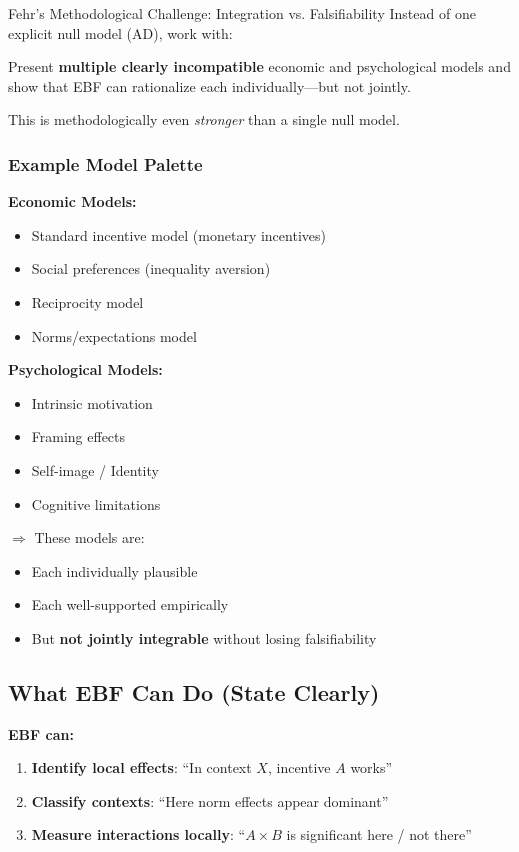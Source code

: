 \begin{chapter}{Fehr's Methodological Challenge: Integration vs. Falsifiability}
Instead of one explicit null model (AD), work with:

\begin{tcolorbox}[colback=green!5!white,colframe=green!75!black,title=\textbf{The Multiple Models Strategy}]
Present \textbf{multiple clearly incompatible} economic and psychological models
and show that EBF can rationalize each individually---but not jointly.

This is methodologically even \textit{stronger} than a single null model.
\end{tcolorbox}

\subsubsection{Example Model Palette}

\textbf{Economic Models:}
\begin{itemize}[noitemsep]
    \item Standard incentive model (monetary incentives)
    \item Social preferences (inequality aversion)
    \item Reciprocity model
    \item Norms/expectations model
\end{itemize}

\textbf{Psychological Models:}
\begin{itemize}[noitemsep]
    \item Intrinsic motivation
    \item Framing effects
    \item Self-image / Identity
    \item Cognitive limitations
\end{itemize}

$\Rightarrow$ These models are:
\begin{itemize}[noitemsep]
    \item Each individually plausible
    \item Each well-supported empirically
    \item But \textbf{not jointly integrable} without losing falsifiability
\end{itemize}

\subsection{What EBF Can Do (State Clearly)}

\textbf{EBF can:}
\begin{enumerate}[noitemsep]
    \item \textbf{Identify local effects}: ``In context $X$, incentive $A$ works''
    \item \textbf{Classify contexts}: ``Here norm effects appear dominant''
    \item \textbf{Measure interactions locally}: ``$A \times B$ is significant here / not there''
\end{enumerate}


\end{chapter}
